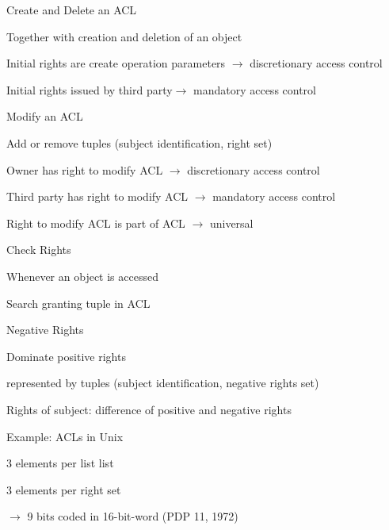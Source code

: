\documentclass[a4paper]{article}
\begin{document}
\begin{multicols}{3}
    Create and Delete an ACL
    \begin{itemize*}
        \item Together with creation and deletion of an object
        \item Initial rights are create operation parameters $\rightarrow$ discretionary access control
        \item Initial rights issued by third party$\rightarrow$ mandatory access control
    \end{itemize*}

    Modify an ACL
    \begin{itemize*}
        \item Add or remove tuples (subject identification, right set)
        \item Owner has right to modify ACL $\rightarrow$ discretionary access control
        \item Third party has right to modify ACL $\rightarrow$ mandatory access control
        \item Right to modify ACL is part of ACL $\rightarrow$ universal
    \end{itemize*}

    Check Rights
    \begin{itemize*}
        \item Whenever an object is accessed
        \item Search granting tuple in ACL
    \end{itemize*}

    Negative Rights
    \begin{itemize*}
        \item Dominate positive rights
        \item represented by tuples (subject identification, negative rights set)
        \item Rights of subject: difference of positive and negative rights
    \end{itemize*}

    \begin{multicols}{2}
        Example: ACLs in Unix
        \begin{itemize*}
            \item 3 elements per list list
            \item 3 elements per right set
            \item[$\rightarrow$] 9 bits coded in 16-bit-word (PDP 11, 1972)
        \end{itemize*}
        \columnbreak


\end{multicols}
\end{multicols}
\end{document}
